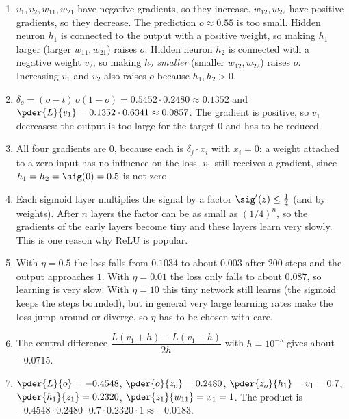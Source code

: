 \begin{enumerate}[label=\textbf{\ansnum.\arabic*}]
  \item $v_1,v_2,w_{11},w_{21}$ have negative gradients, so they increase. $w_{12},w_{22}$ have positive gradients, so they decrease. The prediction $o\approx0.55$ is too small. Hidden neuron $h_1$ is connected to the output with a positive weight, so making $h_1$ larger (larger $w_{11},w_{21}$) raises $o$. Hidden neuron $h_2$ is connected with a negative weight $v_2$, so making $h_2$ \emph{smaller} (smaller $w_{12},w_{22}$) raises $o$. Increasing $v_1$ and $v_2$ also raises $o$ because $h_1,h_2>0$.
  \item $\delta_o=(o-t)\,o(1-o)=0.5452\cdot0.2480\approx0.1352$ and $\pder{L}{v_1}=0.1352\cdot0.6341\approx0.0857$. The gradient is positive, so $v_1$ decreases: the output is too large for the target $0$ and has to be reduced.
  \item All four gradients are $0$, because each is $\delta_j\cdot x_i$ with $x_i=0$: a weight attached to a zero input has no influence on the loss. $v_1$ still receives a gradient, since $h_1=h_2=\sig(0)=0.5$ is not zero.
  \item Each sigmoid layer multiplies the signal by a factor $\sig'(z)\le\tfrac14$ (and by weights). After $n$ layers the factor can be as small as $(1/4)^n$, so the gradients of the early layers become tiny and these layers learn very slowly. This is one reason why ReLU is popular.
  \item With $\eta=0.5$ the loss falls from $0.1034$ to about $0.003$ after $200$ steps and the output approaches $1$. With $\eta=0.01$ the loss only falls to about $0.087$, so learning is very slow. With $\eta=10$ this tiny network still learns (the sigmoid keeps the steps bounded), but in general very large learning rates make the loss jump around or diverge, so $\eta$ has to be chosen with care.
  \item The central difference $\dfrac{L(v_1+h)-L(v_1-h)}{2h}$ with $h=10^{-5}$ gives about $-0.0715$.
  \item $\pder{L}{o}=-0.4548$, $\pder{o}{z_o}=0.2480$, $\pder{z_o}{h_1}=v_1=0.7$, $\pder{h_1}{z_1}=0.2320$, $\pder{z_1}{w_{11}}=x_1=1$. The product is $-0.4548\cdot0.2480\cdot0.7\cdot0.2320\cdot1\approx-0.0183$.
\end{enumerate}
